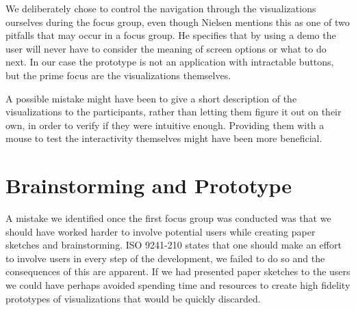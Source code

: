 We deliberately chose to control the navigation through the visualizations ourselves during the focus group, even though Nielsen mentions this as one of two pitfalls that may occur in a focus group. He specifies that by using a demo the user will never have to consider the meaning of screen options or what to do next. In our case the prototype is not an application with intractable buttons, but the prime focus are the visualizations themselves. 

A possible mistake might have been to give a short description of the visualizations to the participants, rather than letting them figure it out on their own, in order to verify if they were intuitive enough. Providing them with a mouse to test the interactivity themselves might have been more beneficial.

\section{Brainstorming and Prototype}
A mistake we identified once the first focus group was conducted was that we should have worked harder to involve potential users while creating paper sketches and brainstorming. ISO 9241-210 states that one should make an effort to involve users in every step of the development, we failed to do so and the consequences of this are apparent. If we had presented paper sketches to the users we could have perhaps avoided spending time and resources to create high fidelity prototypes of visualizations that would be quickly discarded.
